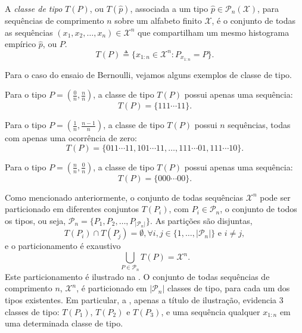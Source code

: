 \begin{definition}
  A \emph{classe de tipo} $T(P)$, ou $T(\hat{p})$, associada a um tipo $\hat{p} \in \mathcal{P}_n(\mathcal{X})$, 
    para sequências de comprimento $n$ sobre um alfabeto finito $\mathcal{X}$, 
    é o conjunto de todas as sequências $(x_1, x_2, \ldots, x_n) \in \mathcal{X}^n$ 
    que compartilham um mesmo histograma empírico $\hat{p}$, ou $P$.
    \begin{equation}
      T(P) \triangleq \{ x_{1:n} \in \mathcal{X}^n : P_{x_{1:n}} = P \} .
    \end{equation}
\end{definition}
\begin{example}
Para o caso do ensaio de Bernoulli, vejamos alguns exemplos de classe de tipo.

Para o tipo $P = \left( \frac{0}{n}, \frac{n}{n} \right)$, a classe de tipo $T(P)$ 
possui apenas uma sequência:
\begin{equation}
    T(P) = \{ 111\cdots{}11 \} .
\end{equation}

Para o tipo $P = \left( \frac{1}{n} , \frac{n-1}{n} \right)$, a classe de tipo $T(P)$
possui $n$ sequências, todas com apenas uma ocorrência de zero:
\begin{equation}
    T(P) = \{ 011\cdots{}11, 101\cdots{}11, \ldots, 111\cdots{}01, 111\cdots{}10 \} .
\end{equation}

Para o tipo $P = \left( \frac{n}{n}, \frac{0}{n} \right)$, a classe de tipo $T(P)$
possui apenas uma sequência:
\begin{equation}
    T(P) = \{ 000\cdots{}00 \} .
\end{equation}
\end{example}


Como mencionado anteriormente, o conjunto de todas sequências $\mathcal{X}^n$
pode ser particionado em diferentes conjuntos $T(P_i)$, com $P_i \in \mathcal{P}_n$,
o conjunto de todos os tipos, ou seja, $\mathcal{P}_n = \{ P_1, P_2, \ldots, P_{\vert \mathcal{P}_n \vert} \}$.
As partições são disjuntas,
\begin{equation}
    T(P_i) \cap T(P_j) = \emptyset, \forall i,j \in \{1, \ldots, \vert \mathcal{P}_n \vert\} \text{ e } i \neq j,
\end{equation}
e o particionamento é exaustivo
\begin{equation}
  \bigcup_{P \in \mathcal{P}_n} T(P) = \mathcal{X}^n.
\end{equation}
Este particionamento é ilustrado na .
O conjunto de todas sequências de comprimento $n$, $\mathcal{X}^n$, é particionado
em $\vert \mathcal{P}_n \vert$ classes de tipo, para cada um dos tipos existentes.
Em particular, a , apenas a título de ilustração, evidencia
3 classes de tipo: $T(P_1)$, $T(P_2)$ e $T(P_3)$, e uma sequência qualquer $x_{1:n}$
em uma determinada classe de tipo.

